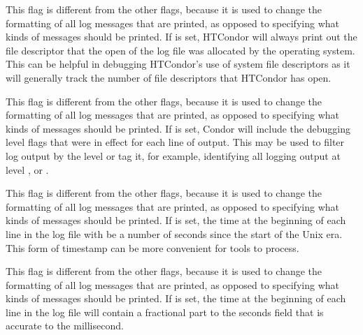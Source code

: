 \begin{description}
\begin{description}
  \label{dflag:fds}
  \item[\Dflag{FDS}]
    This flag is different from the other flags, because it is
    used to change the formatting of all log messages that are printed,
    as opposed to specifying what kinds of messages should be printed.
    If  is set, HTCondor will always print out the file descriptor
    that the open of the log file was allocated by the operating system.
    This can be helpful in debugging HTCondor's use of system file
    descriptors as it will generally track the number of file descriptors
    that HTCondor has open.

  \label{dflag:category}
  \item[\Dflag{CATEGORY}]
    This flag is different from the other flags, because it is
    used to change the formatting of all log messages that are printed,
    as opposed to specifying what kinds of messages should be printed.
    If  is set, Condor will include the debugging level flags 
    that were in effect for each line of output.  
    This may be used to filter log output by the level or 
    tag it, for example, identifying all
    logging output at level , or .

  \label{dflag:timestamp}
  \item[\Dflag{TIMESTAMP}]
    This flag is different from the other flags, because it is
    used to change the formatting of all log messages that are printed,
    as opposed to specifying what kinds of messages should be printed.
    If  is set, the time at the beginning of each line in the
    log file with be a number of seconds since the start of the Unix era. This
    form of timestamp can be more convenient for tools to process.

  \label{dflag:subsecond}
  \item[\Dflag{SUB\_SECOND}]
    This flag is different from the other flags, because it is
    used to change the formatting of all log messages that are printed,
    as opposed to specifying what kinds of messages should be printed.
    If  is set, the time at the beginning of each line in the
    log file will contain a fractional part to the seconds field that is accurate
    to the millisecond.


\end{description}
\end{description}
